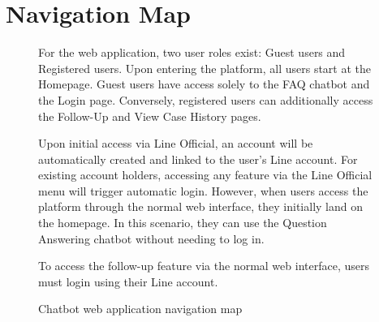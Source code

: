 \documentclass[12pt,oneside,openright,a4paper]{cpe-english-project}
\begin{document}
  \section{Navigation Map}
    \begin{figure}[!h]
      \centering
      \caption{Chatbot web application navigation map}\label{fig:Navigation_Map}
      \begin{justify}
        \qquad For the web application, two user roles exist: Guest users and Registered users. Upon entering the platform, all users start at the Homepage. Guest users have access solely to the FAQ chatbot and the Login page. Conversely, registered users can additionally access the Follow-Up  and View Case History pages.  \par
        \qquad Upon initial access via Line Official, an account will be automatically created and linked to the user’s Line account. For existing account holders, accessing any feature via the Line Official menu will trigger automatic login. However, when users access the platform through the normal web interface, they initially land on the homepage. In this scenario, they can use the Question Answering chatbot without needing to log in.  \par
        \qquad To access the follow-up feature via the normal web interface, users must login using their Line account. \par
      \end{justify}
    \end{figure}
\end{document}
